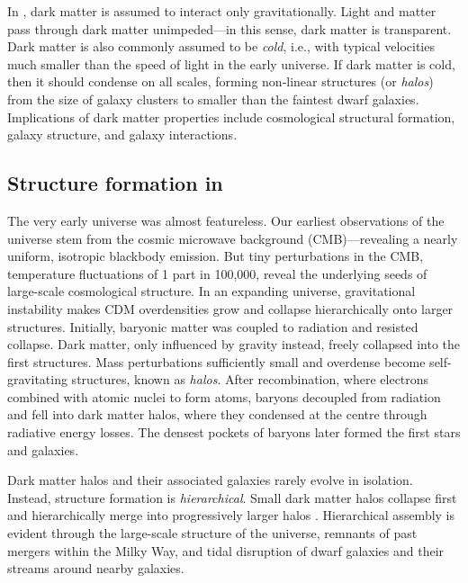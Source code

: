In \LCDM{}, dark matter is assumed to interact only gravitationally.
Light and matter pass through dark matter unimpeded---in this sense,
dark matter is transparent. Dark matter is also commonly assumed to be
\emph{cold}, i.e., with typical velocities much smaller than the speed
of light in the early universe. If dark matter is cold, then it should
condense on all scales, forming non-linear structures (or \emph{halos})
from the size of galaxy clusters to smaller than the faintest dwarf
galaxies. Implications of dark matter properties include cosmological
structural formation, galaxy structure, and galaxy interactions.

\subsection{\texorpdfstring{Structure formation in
\LCDM{}}{Structure formation in }}\label{structure-formation-in}

The very early universe was almost featureless. Our earliest
observations of the universe stem from the cosmic microwave background
(CMB)---revealing a nearly uniform, isotropic blackbody emission. But
tiny perturbations in the CMB, temperature fluctuations of 1 part in
100,000, reveal the underlying seeds of large-scale cosmological
structure. In an expanding universe, gravitational instability makes CDM
overdensities grow and collapse hierarchically onto larger structures.
Initially, baryonic matter was coupled to radiation and resisted
collapse. Dark matter, only influenced by gravity instead, freely
collapsed into the first structures. Mass perturbations sufficiently
small and overdense become self-gravitating structures, known as
\emph{halos}. After recombination, where electrons combined with atomic
nuclei to form atoms, baryons decoupled from radiation and fell into
dark matter halos, where they condensed at the centre through radiative
energy losses. The densest pockets of baryons later formed the first
stars and galaxies.

Dark matter halos and their associated galaxies rarely evolve in
isolation. Instead, \LCDM{} structure formation is \emph{hierarchical}.
Small dark matter halos collapse first and hierarchically merge into
progressively larger halos
\citep[e.g.,][]{white+rees1978, blumenthal+1984, white+frenk1991}.
Hierarchical assembly is evident through the large-scale structure of
the universe, remnants of past mergers within the Milky Way, and tidal
disruption of dwarf galaxies and their streams around nearby galaxies.

